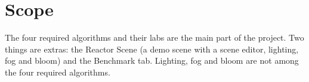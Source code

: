 \section{Scope}
The four required algorithms and their labs are the main part of the project. Two things are extras: the Reactor Scene (a demo scene with a scene editor, lighting, fog and bloom) and the Benchmark tab. Lighting, fog and bloom are not among the four required algorithms.
